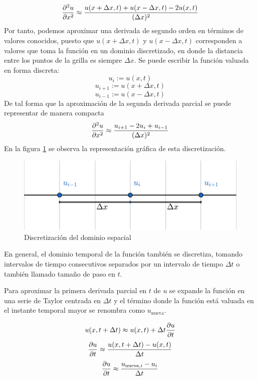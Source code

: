\documentclass[12pt]{article}
\begin{document}
	\begin{equation}
		\pdv{^{2}u}{x^2}\approx \frac{u(x + \Delta x,t) + u(x - \Delta x,t) - 2 u(x,t)}{(\Delta x)^2}
	\end{equation}
	Por tanto, podemos aproximar una derivada de segundo orden en términos de valores conocidos, puesto que $u(x + \Delta x,t)$ y $u(x - \Delta x,t)$ corresponden a valores que toma la función en un dominio discretizado, en donde la distancia entre los puntos de la grilla es siempre $\Delta x$. Se puede escribir la función valuada en forma discreta:
	\[u_{i} := u(x,t)\]
	\[u_{i+1} := u(x + \Delta x,t)\]
	\[u_{i-1} := u(x - \Delta x,t)\]
	De tal forma que la aproximación de la segunda derivada parcial se puede representar de manera compacta
	\begin{equation}
		\pdv{^{2}u}{x^2} \approx \frac{u_{i+1}-2u_{i}+u_{i-1}}{(\Delta x)^{2}}
		\label{eq:segunda-derivada-discreta}
	\end{equation}
	En la figura \ref{fig:discretizacion} se observa la representación gráfica de esta discretización.
	
	\begin{figure}[ht]
		\centering
		\includegraphics[scale=0.8]{images/grilla.pdf}
		\caption{Discretización del dominio espacial}
		\label{fig:discretizacion}
	\end{figure}
	
	
	En general, el dominio temporal de la función también se discretiza, tomando intervalos de tiempo consecutivos separados por un intervalo de tiempo $\Delta t$ o también llamado tamaño de paso en $t$. 
	
	\newpage
	Para aproximar la primera derivada parcial en $t$ de $u$ se expande la función en una serie de Taylor centrada en $\Delta t$ y el término donde la función está valuada en el instante temporal mayor se renombra como $u_{\text{nueva}}$.
	
	\[u(x,t+\Delta t)\approx u(x,t) + \Delta t \pdv{u}{t}\]
	\[\pdv{u}{t} \approx \frac{u(x,t+\Delta t) - u(x,t)}{\Delta t}\]
	\[\pdv{u}{t} \approx \frac{u_{\text{nueva,} i} - u_{i}}{\Delta t}\]
	
\end{document}
